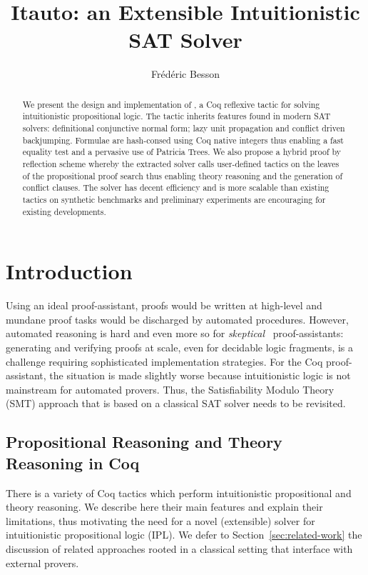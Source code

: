 \documentclass[a4paper,UKenglish,cleveref, autoref, thm-restate]{lipics-v2019}
\title{Itauto: an Extensible Intuitionistic SAT Solver}
\author{Frédéric Besson}{Inria, Univ Rennes, IRISA}{frederic.besson@inria.fr}{}{}
\begin{document}
\maketitle

\begin{abstract}
  We present the design and implementation of , a Coq
  reflexive tactic for solving intuitionistic propositional logic. The
  tactic inherits features found in modern SAT solvers: definitional
  conjunctive normal form; lazy unit propagation and conflict driven
  backjumping.
  Formulae are hash-consed using Coq native integers thus enabling a
  fast equality test and a pervasive use of Patricia Trees.
  We also propose a hybrid proof by reflection scheme whereby the
  extracted solver calls user-defined tactics on the leaves of the
  propositional proof search thus enabling theory reasoning and the
  generation of conflict clauses.
  The solver has decent efficiency and is more scalable than existing
  tactics on synthetic benchmarks and preliminary experiments are
  encouraging for existing developments.
\end{abstract}


\section{Introduction}
\label{sec:intro}
Using an ideal proof-assistant, proofs would be written at high-level
and mundane proof tasks would be discharged by automated procedures.
%
However, automated reasoning is hard and even more so for
\emph{skeptical}~\cite{HarrisonT98} proof-assistants: generating and
verifying proofs at scale, even for decidable logic fragments, is a
challenge requiring sophisticated implementation strategies.
%
For the Coq proof-assistant, the situation is made slightly worse
because intuitionistic logic is not mainstream for automated provers.
Thus, the Satisfiability Modulo Theory (SMT) approach that is based on a
classical SAT solver needs to be revisited. 

\subsection{Propositional Reasoning and Theory Reasoning in Coq}
\label{sec:prop-in-coq}

There is a variety of Coq tactics which perform intuitionistic
propositional and theory reasoning. We describe here their main
features and explain their limitations, thus motivating the need for a
novel (extensible) solver for intuitionistic propositional logic
(IPL). We defer to Section~\ref{sec:related-work} the discussion of
related approaches rooted in a classical setting that interface with
external provers.
\end{document}
